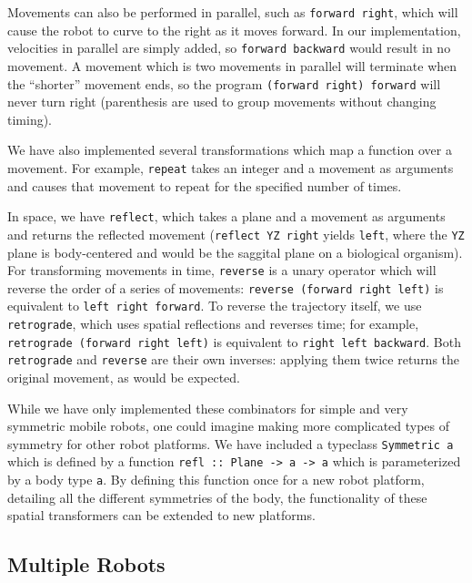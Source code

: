 \documentclass[sigconf]{acmart}
\begin{document}
Movements can also be performed in parallel, such as
\texttt{forward \textbar{}\textbar{} right}, which will cause the
robot to curve to the right as it moves forward. In our implementation,
velocities in parallel are simply added, so
\texttt{forward \textbar{}\textbar{} backward} would result in no
movement. A movement which is two movements in parallel will terminate
when the ``shorter'' movement ends, so the program
\texttt{(forward right) \textbar{}\textbar{} forward} will never turn
right (parenthesis are used to group movements without changing timing).

We have also implemented several transformations which map a function
over a movement. For example, \texttt{repeat} takes an integer and a
movement as arguments and causes that movement to repeat for the
specified number of times.

In space, we have \texttt{reflect}, which takes a plane and a movement
as arguments and returns the reflected movement
(\texttt{reflect\ YZ\ right} yields \texttt{left}, where the \texttt{YZ}
plane is body-centered and would be the saggital plane on a biological
organism). For transforming movements in time, \texttt{reverse} is a
unary operator which will reverse the order of a series of movements:
\texttt{reverse\ (forward\ right\ left)} is equivalent to
\texttt{left\ right\ forward}. To reverse the trajectory itself, we use
\texttt{retrograde}, which uses spatial reflections and reverses time;
for example, \texttt{retrograde\ (forward\ right\ left)} is equivalent
to \texttt{right\ left\ backward}. Both \texttt{retrograde} and
\texttt{reverse} are their own inverses: applying them twice returns the
original movement, as would be expected.

While we have only implemented these combinators for simple and very
symmetric mobile robots, one could imagine making more complicated types
of symmetry for other robot platforms. We have included a typeclass
\texttt{Symmetric\ a} which is defined by a function
\texttt{refl\ ::\ Plane\ -\textgreater{}\ a\ -\textgreater{}\ a} which
is parameterized by a body type \texttt{a}. By defining this function
once for a new robot platform, detailing all the different symmetries of
the body, the functionality of these spatial transformers can be
extended to new platforms.

\subsection{Multiple Robots}\label{multiple-robots}
\end{document}
